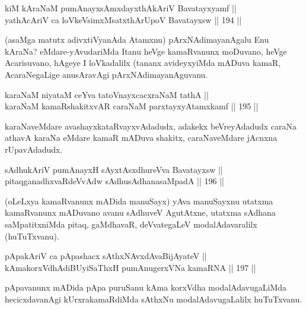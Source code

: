 \begin{shl}
kiM kAraNaM pumAnayxsAmxdayxthAkAriV Bavatayxyamf || \\
yathAcAriV ca loVkeV\s simxMsatxthArUpoV Bavatayxsw \hfill || 194 ||  
\end{shl}

\begin{artha}
(asaMga matutx adivxtiVyanAda Atamxnu) pArxNAdimayanAgalu Enu
kAraNa? eMdare-yAvudariMda Itanu heVge kamaRvanunx moDuvano, heVge
Acarisuvano, hAgeye I loVkadalilx (tananx avideyxyiMda mADuva kamaR,
AcaraNegaLige anusAravAgi pArxNAdimayanAguvanu.
\end{artha}


\begin{shl}
karaNaM niyataM ceYva tatoV\s nayxcacxraNaM tathA || \\
karaNaM kamaRshakitxvAR caraNaM parxtayxyAtamxkamf \hfill || 195 ||  
\end{shl}

\begin{artha}
karaNaveMdare avashayxkataRvayxvAdadudx, adakekx beVreyAdadudx caraNa
athavA karaNa eMdare kamaR mADuva shakitx, caraNaveMdare jAcnxna
rUpavAdadudx.
\end{artha}


\begin{shl}
sAdhukAriV pumAnayxH sAyxtAsxdhureVva Bavatayxsw || \\
pitaqganadhxvaRdeVvAdw sAdhusAdhanasaMpadA \hfill || 196 ||  
\end{shl}

\begin{artha}
(oLeLxya kamaRvanunx mADida manuSayx) yAva manuSayxnu utatxma
kamaRvanunx mADuvano avanu sAdhuveV AgutAtxne, utatxma sAdhana
saMpatitxniMda pitaq, gaMdhavaR, deVvategaLeV modalAdavaralilx
(huTuTxvanu).
\end{artha}

\begin{shl}
pApakAriV ca pApashacx sAthxNAvxdAvaBijAyateV || \\
kAmakorxVdhAdiBUyiSaThxH pumAnugerxVNa kamaRNA \hfill || 197 ||  
\end{shl}

\begin{artha}
pApavanunx mADida pApa puruSanu kAma korxVdha modalAdavugaLiMda
hecicxdavanAgi kUrxrakamaRdiMda sAthxNu modalAdavugaLalilx huTuTxvanu.
\end{artha}
